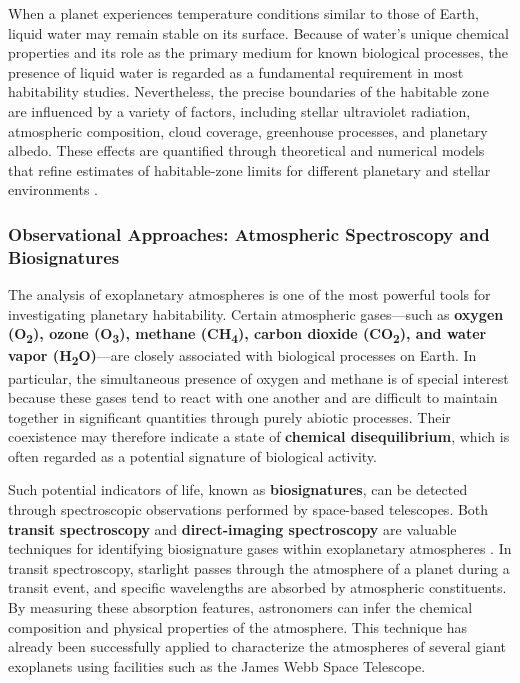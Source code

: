 When a planet experiences temperature conditions similar to those of Earth, liquid water may remain stable on its surface. Because of water's unique chemical properties and its role as the primary medium for known biological processes, the presence of liquid water is regarded as a fundamental requirement in most habitability studies. Nevertheless, the precise boundaries of the habitable zone are influenced by a variety of factors, including stellar ultraviolet radiation, atmospheric composition, cloud coverage, greenhouse processes, and planetary albedo. These effects are quantified through theoretical and numerical models that refine estimates of habitable-zone limits for different planetary and stellar environments \cite{seager2013}.

\subsubsection{Observational Approaches: Atmospheric Spectroscopy and Biosignatures}

The analysis of exoplanetary atmospheres is one of the most powerful tools for investigating planetary habitability. Certain atmospheric gases---such as \textbf{oxygen (O\textsubscript{2}), ozone (O\textsubscript{3}), methane (CH\textsubscript{4}), carbon dioxide (CO\textsubscript{2}), and water vapor (H\textsubscript{2}O)}---are closely associated with biological processes on Earth. In particular, the simultaneous presence of oxygen and methane is of special interest because these gases tend to react with one another and are difficult to maintain together in significant quantities through purely abiotic processes. Their coexistence may therefore indicate a state of \textbf{chemical disequilibrium}, which is often regarded as a potential signature of biological activity.

Such potential indicators of life, known as \textbf{biosignatures}, can be detected through spectroscopic observations performed by space-based telescopes. Both \textbf{transit spectroscopy} and \textbf{direct-imaging spectroscopy} are valuable techniques for identifying biosignature gases within exoplanetary atmospheres \cite{robinson2018,quanz2022}. In transit spectroscopy, starlight passes through the atmosphere of a planet during a transit event, and specific wavelengths are absorbed by atmospheric constituents. By measuring these absorption features, astronomers can infer the chemical composition and physical properties of the atmosphere. This technique has already been successfully applied to characterize the atmospheres of several giant exoplanets using facilities such as the James Webb Space Telescope.

